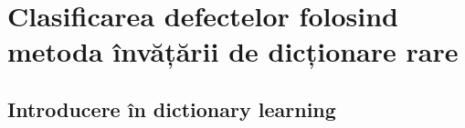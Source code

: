 \chapter{Clasificarea defectelor folosind metoda învățării de dicționare rare}
\label{chap:ml_classification}
\section{Introducere în dictionary learning}

\section{}